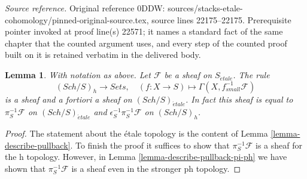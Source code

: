 \documentclass[10pt,a4paper]{amsart}
\theoremstyle{plain}
\newtheorem{lemma}[subsection]{Lemma}
\theoremstyle{definition}
\theoremstyle{remark}
\numberwithin{equation}{subsection}
\def\Sch{\mathit{Sch}}
\def\etale{{\acute{e}tale}}
\begin{document}
\noindent\textit{Source reference.} Original reference 0DDW: sources/stacks-etale-cohomology/pinned-original-source.tex, source lines 22175--22175. Prerequisite pointer invoked at proof line(s) 22571; it names a standard fact of the same chapter that the counted argument uses, and every step of the counted proof built on it is retained verbatim in the delivered body.\par\medskip
\begin{lemma}
\label{lemma-describe-pullback-pi-h}
With notation as above.
Let $\mathcal{F}$ be a sheaf on $S_\etale$. The rule
$$
(\Sch/S)_h \longrightarrow \textit{Sets},\quad
(f : X \to S) \longmapsto \Gamma(X, f_{small}^{-1}\mathcal{F})
$$
is a sheaf and a fortiori a sheaf on $(\Sch/S)_\etale$.
In fact this sheaf is equal to
$\pi_S^{-1}\mathcal{F}$ on $(\Sch/S)_\etale$ and
$\epsilon_S^{-1}\pi_S^{-1}\mathcal{F}$ on $(\Sch/S)_h$.
\end{lemma}

\begin{proof}
The statement about the \'etale topology is the content
of Lemma \ref{lemma-describe-pullback}. To finish the proof it
suffices to show that $\pi_S^{-1}\mathcal{F}$ is a sheaf for the h
topology. However, in Lemma \ref{lemma-describe-pullback-pi-ph}
we have shown that
$\pi_S^{-1}\mathcal{F}$ is a sheaf even in the stronger ph
topology.
\end{proof}
\end{document}
